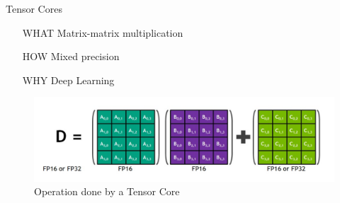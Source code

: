 \begin{frame}{Tensor Cores}
	

		\begin{center}
			\begin{minipage}{0.5\textwidth}

				\begin{itemize}
					\item[WHAT] Matrix-matrix multiplication
					\item[HOW] Mixed precision
					\item[WHY] Deep Learning
				\end{itemize}
			\end{minipage}

			\begin{figure}
				\includegraphics[width=\textwidth]{tensor_core_op}
				\caption{Operation done by a Tensor Core}
			\end{figure}
		\end{center}


	

\end{frame}